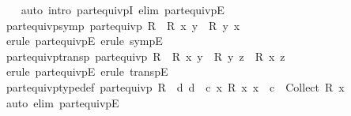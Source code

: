 \begin{isabellebody}
%
\isadelimproof
\ \ %
\endisadelimproof
%
\isatagproof
{}\isamarkupfalse%
\ {\isacharparenleft}{\kern0pt}auto\ intro{\isacharcolon}{\kern0pt}\ part{\isacharunderscore}{\kern0pt}equivpI\ elim{\isacharcolon}{\kern0pt}\ part{\isacharunderscore}{\kern0pt}equivpE{\isacharparenright}{\kern0pt}%
\endisatagproof
{\isafoldproof}%
%
\isadelimproof
\isanewline
%
\endisadelimproof
\isanewline
{}\isamarkupfalse%
\ part{\isacharunderscore}{\kern0pt}equivp{\isacharunderscore}{\kern0pt}symp{\isacharcolon}{\kern0pt}\ {\isachardoublequoteopen}part{\isacharunderscore}{\kern0pt}equivp\ R\ {\isasymLongrightarrow}\ R\ x\ y\ {\isasymLongrightarrow}\ R\ y\ x{\isachardoublequoteclose}\isanewline
%
\isadelimproof
\ \ %
\endisadelimproof
%
\isatagproof
{}\isamarkupfalse%
\ {\isacharparenleft}{\kern0pt}erule\ part{\isacharunderscore}{\kern0pt}equivpE{\isacharcomma}{\kern0pt}\ erule\ sympE{\isacharparenright}{\kern0pt}%
\endisatagproof
{\isafoldproof}%
%
\isadelimproof
\isanewline
%
\endisadelimproof
\isanewline
{}\isamarkupfalse%
\ part{\isacharunderscore}{\kern0pt}equivp{\isacharunderscore}{\kern0pt}transp{\isacharcolon}{\kern0pt}\ {\isachardoublequoteopen}part{\isacharunderscore}{\kern0pt}equivp\ R\ {\isasymLongrightarrow}\ R\ x\ y\ {\isasymLongrightarrow}\ R\ y\ z\ {\isasymLongrightarrow}\ R\ x\ z{\isachardoublequoteclose}\isanewline
%
\isadelimproof
\ \ %
\endisadelimproof
%
\isatagproof
{}\isamarkupfalse%
\ {\isacharparenleft}{\kern0pt}erule\ part{\isacharunderscore}{\kern0pt}equivpE{\isacharcomma}{\kern0pt}\ erule\ transpE{\isacharparenright}{\kern0pt}%
\endisatagproof
{\isafoldproof}%
%
\isadelimproof
\isanewline
%
\endisadelimproof
\isanewline
{}\isamarkupfalse%
\ part{\isacharunderscore}{\kern0pt}equivp{\isacharunderscore}{\kern0pt}typedef{\isacharcolon}{\kern0pt}\ {\isachardoublequoteopen}part{\isacharunderscore}{\kern0pt}equivp\ R\ {\isasymLongrightarrow}\ {\isasymexists}d{\isachardot}{\kern0pt}\ d\ {\isasymin}\ {\isacharbraceleft}{\kern0pt}c{\isachardot}{\kern0pt}\ {\isasymexists}x{\isachardot}{\kern0pt}\ R\ x\ x\ {\isasymand}\ c\ {\isacharequal}{\kern0pt}\ Collect\ {\isacharparenleft}{\kern0pt}R\ x{\isacharparenright}{\kern0pt}{\isacharbraceright}{\kern0pt}{\isachardoublequoteclose}\isanewline
%
\isadelimproof
\ \ %
\endisadelimproof
%
\isatagproof
{}\isamarkupfalse%
\ {\isacharparenleft}{\kern0pt}auto\ elim{\isacharcolon}{\kern0pt}\ part{\isacharunderscore}{\kern0pt}equivpE{\isacharparenright}{\kern0pt}%
\endisatagproof
{\isafoldproof}%
%
\isadelimproof
%
\endisadelimproof

\end{isabellebody}
